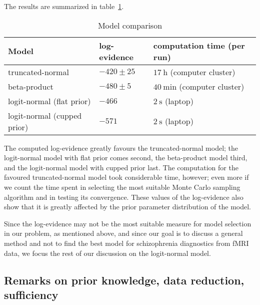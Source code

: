 The results are summarized in table~\ref{tab:model_comparison}.
\begin{table}[!t]
  \centering
  \begin{tabular}{lll}
    \textbf{Model} & \textbf{log-evidence} & \textbf{computation
                                                    time (per run)}\\
    \hline
    truncated-normal & $-420\pm 25$& $17\:\mathrm{h}$ (computer cluster)\\
    beta-product & $-480\pm 5$ & $40\:\mathrm{min}$ (computer cluster)\\
    logit-normal (flat prior)& $-466$ & $2\:\mathrm{s}$ (laptop)\\
    logit-normal (cupped prior)& $-571$ & $2\:\mathrm{s}$ (laptop)
  \end{tabular}
    \caption{Model comparison}
  \label{tab:model_comparison}
\end{table}
The computed log-evidence greatly favours the truncated-normal model; the
logit-normal model with flat prior comes second, the beta-product model
third, and the logit-normal model with cupped prior last. The computation
for the favoured truncated-normal model took considerable time, however;
even more if we count the time spent in selecting the most suitable Monte
Carlo sampling algorithm and in testing its convergence. These values of
the log-evidence also show that it is greatly affected by the prior
parameter distribution of the model.

Since the log-evidence may not be the most suitable measure for model
selection in our problem, as mentioned above, and since our goal is to
discuss a general method and not to find the best model for schizophrenia
diagnostics from fMRI data, we focus the rest of our discussion on the
logit-normal model.

\subsection{Remarks on prior knowledge, data reduction, sufficiency}
\label{sec:data_prior_model}

